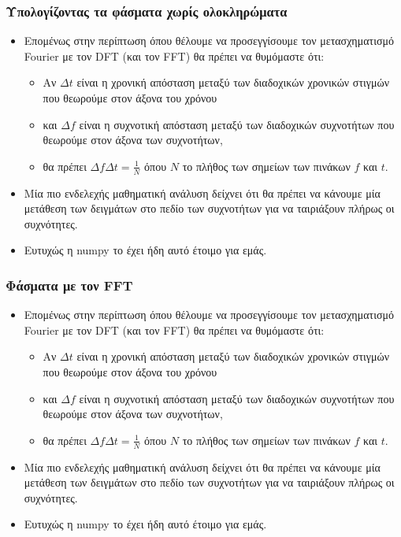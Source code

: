 \documentclass[9pt]{beamer}
\begin{document}
	\begin{frame}
	\frametitle{Υπολογίζοντας τα φάσματα χωρίς ολοκληρώματα}
	\begin{itemize}
		\item Επομένως στην περίπτωση όπου θέλουμε να προσεγγίσουμε τον μετασχηματισμό Fourier με τον DFT (και τον FFT) θα πρέπει να θυμόμαστε ότι:
		\begin{itemize}
			\item Αν $\Delta t$ είναι η χρονική απόσταση μεταξύ των διαδοχικών χρονικών στιγμών που θεωρούμε στον άξονα του χρόνου
			\item και $\Delta f$ είναι η συχνοτική απόσταση μεταξύ των διαδοχικών συχνοτήτων που θεωρούμε στον άξονα των συχνοτήτων,
			\item θα πρέπει $\Delta f\Delta t = \frac{1}{N}$ όπου $N$ το πλήθος των σημείων των πινάκων $f$ και $t$.			
		\end{itemize}
		\item Μία πιο ενδελεχής μαθηματική ανάλυση δείχνει ότι θα πρέπει να κάνουμε μία μετάθεση των δειγμάτων στο πεδίο των συχνοτήτων για να ταιριάξουν πλήρως οι συχνότητες.
		\item Ευτυχώς η numpy το έχει ήδη αυτό έτοιμο για εμάς.
	\end{itemize}
	\end{frame}
		
	\begin{frame}
	\frametitle{Φάσματα με τον FFT}
	\begin{itemize}
		\item Επομένως στην περίπτωση όπου θέλουμε να προσεγγίσουμε τον μετασχηματισμό Fourier με τον DFT (και τον FFT) θα πρέπει να θυμόμαστε ότι:
		\begin{itemize}
			\item Αν $\Delta t$ είναι η χρονική απόσταση μεταξύ των διαδοχικών χρονικών στιγμών που θεωρούμε στον άξονα του χρόνου
			\item και $\Delta f$ είναι η συχνοτική απόσταση μεταξύ των διαδοχικών συχνοτήτων που θεωρούμε στον άξονα των συχνοτήτων,
			\item θα πρέπει $\Delta f\Delta t = \frac{1}{N}$ όπου $N$ το πλήθος των σημείων των πινάκων $f$ και $t$.			
		\end{itemize}
		\item Μία πιο ενδελεχής μαθηματική ανάλυση δείχνει ότι θα πρέπει να κάνουμε μία μετάθεση των δειγμάτων στο πεδίο των συχνοτήτων για να ταιριάξουν πλήρως οι συχνότητες.
		\item Ευτυχώς η numpy το έχει ήδη αυτό έτοιμο για εμάς.
	\end{itemize}
	\end{frame}
	
\end{document}
